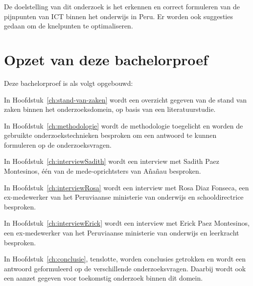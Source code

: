 
De doelstelling van dit onderzoek is het erkennen en correct formuleren van de pijnpunten van ICT binnen het onderwijs in Peru. Er worden ook suggesties gedaan om de knelpunten te optimaliseren.

\section{Opzet van deze bachelorproef}
\label{sec:opzet-bachelorproef}


Deze bachelorproef is als volgt opgebouwd:

In Hoofdstuk~\ref{ch:stand-van-zaken} wordt een overzicht gegeven van de stand van zaken binnen het onderzoeksdomein, op basis van een literatuurstudie.

In Hoofdstuk~\ref{ch:methodologie} wordt de methodologie toegelicht en worden de gebruikte onderzoekstechnieken besproken om een antwoord te kunnen formuleren op de onderzoeksvragen.

In Hoofdstuk~\ref{ch:interviewSadith} wordt een interview met Sadith Paez Montesinos, één van de mede-oprichtsters van Añañau besproken.

In Hoofdstuk~\ref{ch:interviewRosa} wordt een interview met Rosa Diaz Fonseca, een ex-medewerker van het Peruviaanse ministerie van onderwijs en schooldirectrice besproken.

In Hoofdstuk~\ref{ch:interviewErick} wordt een interview met Erick Paez Montesinos, een ex-medewerker van het Peruviaanse ministerie van onderwijs en leerkracht besproken.

In Hoofdstuk~\ref{ch:conclusie}, tenslotte, worden conclusies getrokken en wordt een antwoord geformuleerd op de verschillende onderzoeksvragen. Daarbij wordt ook een aanzet gegeven voor toekomstig onderzoek binnen dit domein.